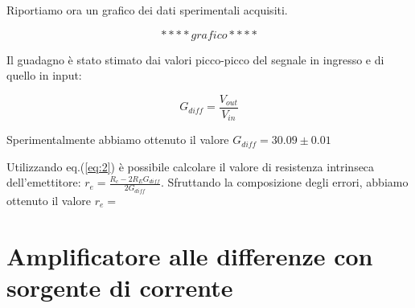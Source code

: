 Riportiamo ora un grafico dei dati sperimentali acquisiti. 

$$****grafico****$$


Il guadagno è stato stimato dai valori picco-picco del segnale in ingresso e di quello in input:

$$G_{diff}=\frac{V_{out}}{V_{in}}$$

Sperimentalmente abbiamo ottenuto il valore $G_{diff}=30.09 \pm 0.01$


Utilizzando eq.(\ref{eq:2}) è possibile calcolare il valore di resistenza intrinseca dell'emettitore: $r_e=\frac{R_c-2R_E G_{diff}}{2G_{diff}}$.
Sfruttando la composizione degli errori, abbiamo ottenuto il valore $r_e=$


\section{Amplificatore alle differenze con sorgente di corrente}